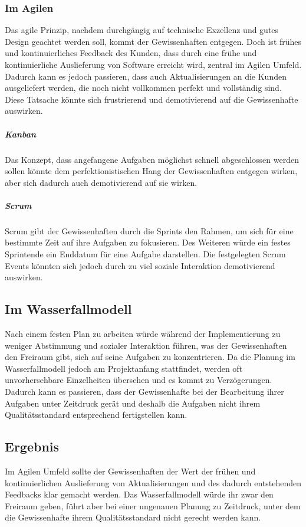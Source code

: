 \documentclass[twocolumn,10pt]{asme2ej}
\begin{document}
\subsubsection{Im Agilen}
Das agile Prinzip, nachdem durchgängig auf technische Exzellenz und gutes Design geachtet werden soll, kommt der Gewissenhaften entgegen. Doch ist frühes und kontinuierliches Feedback des Kunden, dass durch eine frühe und kontinuierliche Auslieferung von Software erreicht wird, zentral im Agilen Umfeld. Dadurch kann es jedoch passieren, dass auch Aktualisierungen an die Kunden ausgeliefert werden, die noch nicht vollkommen perfekt und vollständig sind.  Diese Tatsache könnte sich frustrierend und demotivierend auf die Gewissenhafte auswirken.

\subparagraph{Kanban}
Das Konzept, dass angefangene Aufgaben möglichst schnell abgeschlossen werden sollen könnte dem perfektionistischen Hang der Gewissenhaften entgegen wirken, aber sich dadurch auch demotivierend auf sie wirken.

\subparagraph{Scrum}
Scrum gibt der Gewissenhaften durch die Sprints den Rahmen, um sich für eine bestimmte Zeit auf ihre Aufgaben zu fokusieren. Des Weiteren würde ein festes Sprintende ein Enddatum für eine Aufgabe darstellen. Die festgelegten Scrum Events könnten sich jedoch durch zu viel soziale Interaktion demotivierend auswirken.

\subsection{Im Wasserfallmodell}
Nach einem festen Plan zu arbeiten würde während der Implementierung zu weniger Abstimmung und sozialer Interaktion führen, was der Gewissenhaften den Freiraum gibt, sich auf seine Aufgaben zu konzentrieren. Da die Planung im Wasserfallmodell jedoch am Projektanfang stattfindet, werden oft unvorhersehbare Einzelheiten übersehen und es kommt zu Verzögerungen. Dadurch kann es passieren, dass der Gewissenhafte bei der Bearbeitung ihrer Aufgaben unter Zeitdruck gerät und deshalb die Aufgaben nicht ihrem Qualitätsstandard entsprechend fertigstellen kann.

\subsection{Ergebnis}
Im Agilen Umfeld sollte der Gewissenhaften der Wert der frühen und kontinuierlichen Auslieferung von Aktualisierungen und des dadurch entstehenden Feedbacks klar gemacht werden. Das Wasserfallmodell würde ihr zwar den Freiraum geben, führt aber bei einer ungenauen Planung zu Zeitdruck, unter dem die Gewissenhafte ihrem Qualitätsstandard nicht gerecht werden kann.
\end{document}
